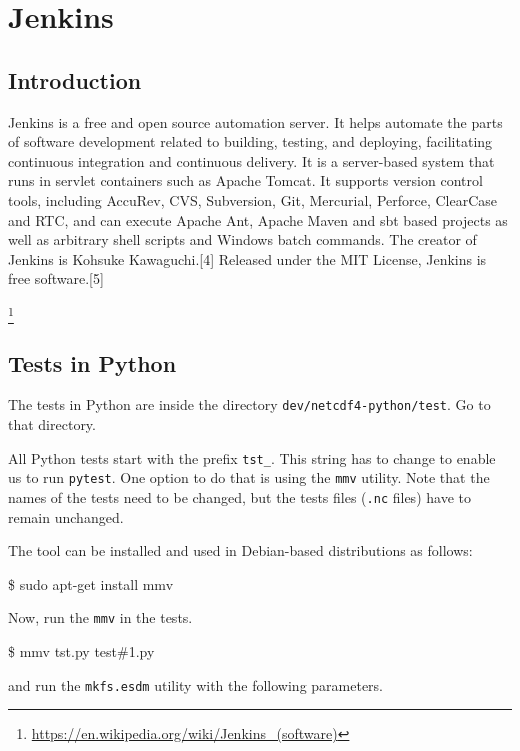 \chapter{Jenkins}
\label{ch:jenkins}

\section{Introduction}

{\itshape

Jenkins is a free and open source automation server. It helps automate the parts of software development related to building, testing, and deploying, facilitating continuous integration and continuous delivery. It is a server-based system that runs in servlet containers such as Apache Tomcat. It supports version control tools, including AccuRev, CVS, Subversion, Git, Mercurial, Perforce, ClearCase and RTC, and can execute Apache Ant, Apache Maven and sbt based projects as well as arbitrary shell scripts and Windows batch commands. The creator of Jenkins is Kohsuke Kawaguchi.[4] Released under the MIT License, Jenkins is free software.[5]
}\footnote{\url{https://en.wikipedia.org/wiki/Jenkins_(software)}}

\section{Tests in Python}

The tests in Python are inside the directory \texttt{dev/netcdf4-python/test}. Go to that directory.

All Python tests start with the prefix \texttt{tst\_}. This string has to change to enable us to run \texttt{pytest}. One option to do that is using the \texttt{mmv} utility. Note that the names of the tests need to be changed, but the tests files (\texttt{.nc} files) have to remain unchanged.

The tool can be installed and used in Debian-based distributions as follows:

\begin{framed}
\$ sudo apt-get install mmv
\end{framed}

Now, run the \texttt{mmv} in the tests.

\begin{framed}
\$ mmv tst\*.py test\#1.py
\end{framed}

and run the \texttt{mkfs.esdm} utility with the following parameters.

